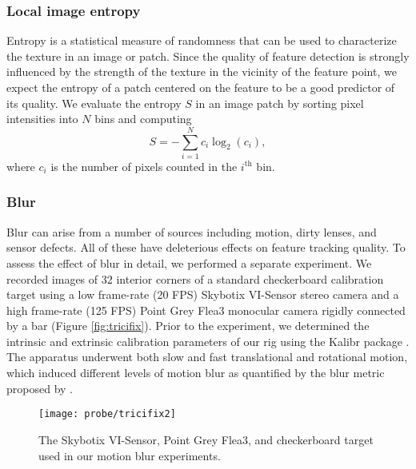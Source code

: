 \subsubsection{Local image entropy}
Entropy is a statistical measure of randomness that can be used to characterize the texture in an image or patch.
Since the quality of feature detection is strongly influenced by the strength of the texture in the vicinity of the feature point, we expect the entropy of a patch centered on the feature to be a good predictor of its quality.
We evaluate the entropy $S$ in an image patch by sorting pixel intensities into $N$ bins and computing
\begin{equation}
    S = -\sum_{i=1}^N c_i \log_2(c_i),
\end{equation}
where $c_i$ is the number of pixels counted in the $i^\text{th}$ bin.


\subsubsection{Blur}
Blur can arise from a number of sources including motion, dirty lenses, and sensor defects.
All of these have deleterious effects on feature tracking quality.
To assess the effect of blur in detail, we performed a separate experiment.
We recorded images of 32 interior corners of a standard checkerboard calibration target using a low frame-rate (20 FPS) Skybotix VI-Sensor stereo camera and a high frame-rate (125 FPS) Point Grey Flea3 monocular camera rigidly connected by a bar (Figure \ref{fig:tricifix}).
Prior to the experiment, we determined the intrinsic and extrinsic calibration parameters of our rig using the Kalibr package \cite{Furgale:2013dm}.
The apparatus underwent both slow and fast translational and rotational motion, which induced different levels of motion blur as quantified by the blur metric proposed by \cite{Anonymous:Ngi3VEEU}.

\begin{figure}
    \centering
    \texttt{[image: probe/tricifix2]}
    \caption{The Skybotix VI-Sensor, Point Grey Flea3, and checkerboard target used in our motion blur experiments.}
    \label{fig:probe_tricifix}
\end{figure}



